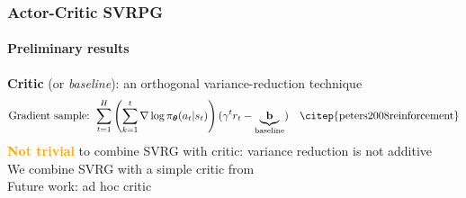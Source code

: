 \documentclass[aspectratio=169]{beamer}
\newcommand{\enb}[1]{\textcolor{poliblue1}{\textbf{#1}}}
\newcommand{\eno}[1]{\textcolor{orange}{\textbf{#1}}}
\newcommand{\vtheta}{\boldsymbol{\theta}}
\begin{document}
\begin{frame} 
\frametitle{Actor-Critic SVRPG}
\framesubtitle{Preliminary results}

\enb{Critic} (or \textit{baseline}): an orthogonal variance-reduction technique
\begin{equation*}
	\text{Gradient sample: } \sum_{t=1}^{H}\left(\sum_{k=1}^t\nabla\log\pi_{\vtheta}(a_t\vert s_t)\right)(\gamma^tr_t - \underbrace{\mathbf{b}}_{\text{baseline}})\quad\text{\citep{peters2008reinforcement}}
\end{equation*}
\vfill
\eno{Not trivial} to combine SVRG with critic: variance reduction is not additive\\
\vfill
We combine SVRG with a simple critic from~\citet{duan2016benchmarking}\\
\vfill
Future work: ad hoc critic

\end{frame}
\end{document}
